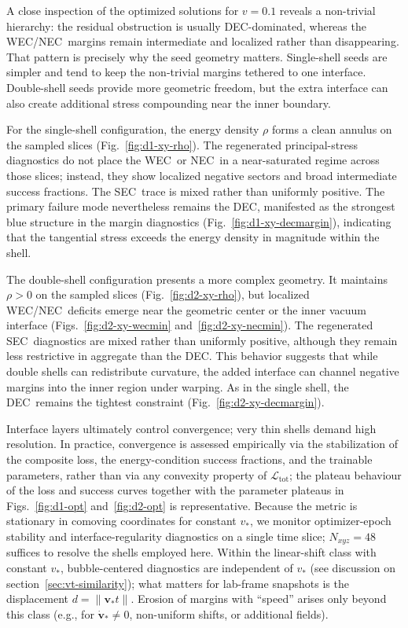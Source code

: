 \documentclass[11pt]{article}
\makeatletter
\newcommand{\@abbr}[1]{\ifmmode\mathrm{#1}\else\textsc{#1}\fi}
\newcommand{\WEC}{\@abbr{WEC}}
\newcommand{\NEC}{\@abbr{NEC}}
\newcommand{\SEC}{\@abbr{SEC}}
\newcommand{\DEC}{\@abbr{DEC}}
\makeatother
\begin{document}
A close inspection of the optimized solutions for $v=0.1$ reveals a non-trivial hierarchy: the residual obstruction is usually \DEC-dominated, whereas the \WEC/\NEC\ margins remain intermediate and localized rather than disappearing. That pattern is precisely why the seed geometry matters. Single-shell seeds are simpler and tend to keep the non-trivial margins tethered to one interface. Double-shell seeds provide more geometric freedom, but the extra interface can also create additional stress compounding near the inner boundary.

For the single-shell configuration, the energy density $\rho$ forms a clean annulus on the sampled slices (Fig.~\ref{fig:d1-xy-rho}). The regenerated principal-stress diagnostics do not place the \WEC\ or \NEC\ in a near-saturated regime across those slices; instead, they show localized negative sectors and broad intermediate success fractions. The \SEC\ trace is mixed rather than uniformly positive. The primary failure mode nevertheless remains the \DEC, manifested as the strongest blue structure in the margin diagnostics (Fig.~\ref{fig:d1-xy-decmargin}), indicating that the tangential stress exceeds the energy density in magnitude within the shell.

The double-shell configuration presents a more complex geometry. It maintains $\rho>0$ on the sampled slices (Fig.~\ref{fig:d2-xy-rho}), but localized \WEC/\NEC\ deficits emerge near the geometric center or the inner vacuum interface (Figs.~\ref{fig:d2-xy-wecmin} and~\ref{fig:d2-xy-necmin}). The regenerated \SEC\ diagnostics are mixed rather than uniformly positive, although they remain less restrictive in aggregate than the \DEC. This behavior suggests that while double shells can redistribute curvature, the added interface can channel negative margins into the inner region under warping. As in the single shell, the \DEC\ remains the tightest constraint (Fig.~\ref{fig:d2-xy-decmargin}).

Interface layers ultimately control convergence; very thin shells demand high resolution. In practice, convergence is assessed empirically via the stabilization of the composite loss, the energy-condition success fractions, and the trainable parameters, rather than via any convexity property of $\mathcal{L}_\text{tot}$; the plateau behaviour of the loss and success curves together with the parameter plateaus in Figs.~\ref{fig:d1-opt} and~\ref{fig:d2-opt} is representative. Because the metric is stationary in comoving coordinates for constant $v_*$, we monitor optimizer-epoch stability and interface-regularity diagnostics on a single time slice; $N_{xyz}=48$ suffices to resolve the shells employed here. Within the linear-shift class with constant $v_*$, bubble-centered diagnostics are independent of $v_*$ (see discussion on section~\ref{sec:vt-similarity}); what matters for lab-frame snapshots is the displacement $d=\|\mathbf v_* t\|$. Erosion of margins with ``speed'' arises only beyond this class (e.g., for $\dot{\mathbf v}_* \neq 0$, non-uniform shifts, or additional fields).
\end{document}
